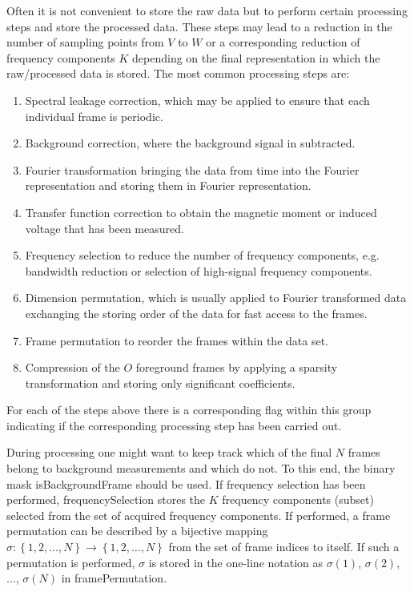 \documentclass[landscape,a4paper]{article} %
\newcommand{\inlvar}[1]{{\ttfamily#1}}
\begin{document}
\begin{multicols}{2}
Often it is not convenient to store the raw data but to perform certain processing steps and store the processed data. These steps may lead to a reduction in the number of sampling points from $V$ to $W$ or a corresponding reduction of frequency components $K$ depending on the final representation in which the raw/processed data is stored. The most common processing steps are:
\begin{enumerate}
	\item Spectral leakage correction, which may be applied to ensure that each individual frame is periodic.
	\item Background correction, where the background signal in subtracted.
	\item Fourier transformation bringing the data from time into the Fourier representation and storing them in Fourier representation.
	\item Transfer function correction to obtain the magnetic moment or induced voltage that has been measured.
	\item Frequency selection to reduce the number of frequency components, e.g. bandwidth reduction or selection of high-signal frequency components.
	\item Dimension permutation, which is usually applied to Fourier transformed data exchanging the storing order of the data for fast access to the frames.
	\item Frame permutation to reorder the frames within the data set.
	\item Compression of the $O$ foreground frames by applying a sparsity transformation and storing only significant coefficients.
\end{enumerate}
For each of the steps above there is a corresponding flag within this group indicating if the corresponding processing step has been carried out. 

During processing one might want to keep track which of the final $N$ frames belong to background measurements and which do not. To this end, the binary mask \inlvar{isBackgroundFrame} should be used. If frequency selection has been performed, \inlvar{frequencySelection} stores the $K$ frequency components (subset) selected from the set of acquired frequency components. If performed, a frame permutation can be described by a bijective mapping $\sigma : \left\{ 1,2,\dots,N \right\} \rightarrow \left\{ 1,2,\dots,N \right\}$ from the set of frame indices to itself. If such a permutation is performed, $\sigma$ is stored in the one-line notation as $\sigma(1)$, $\sigma(2)$, $\dots$, $\sigma(N)$ in \inlvar{framePermutation}.


\end{multicols}
\end{document}
